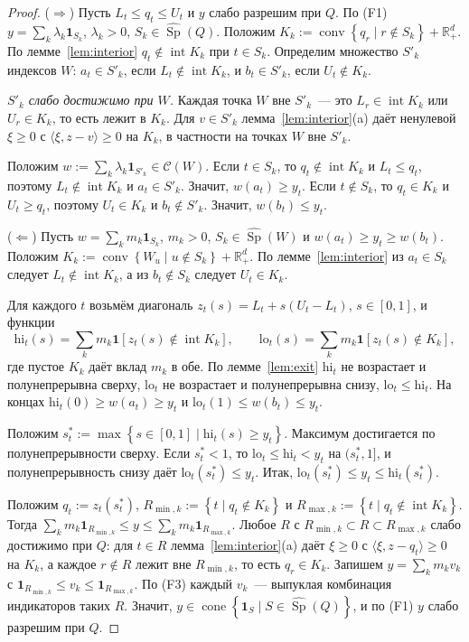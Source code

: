 \documentclass[a4paper,11pt]{article}
\theoremstyle{plain}
\theoremstyle{definition}
\theoremstyle{remark}
\newcommand{\R}{\mathbb{R}}
\newcommand{\set}[1]{\left\{ #1 \right\}}
\newcommand{\ip}[2]{\langle #1, #2\rangle}
\newcommand{\Rp}[1][2]{\R^{#1}_{+}}
\DeclareMathOperator{\conv}{conv}
\DeclareMathOperator{\cone}{cone}
\DeclareMathOperator{\Sp}{Sp}
\DeclareMathOperator{\interior}{int}
\newcommand{\Sw}{\widehat{\Sp}}
\newcommand{\Cw}{\mathcal C}
\begin{document}
\begin{proof}
    ($\Rightarrow$) Пусть $L_t\le q_t\le U_t$ и $y$ слабо разрешим при $Q$. По (F1) $y=\sum_k\lambda_k\mathbf 1_{S_k}$, $\lambda_k>0$, $S_k\in\Sw(Q)$. Положим $K_k:=\conv\set{q_r\mid r\notin S_k}+\Rp[d]$. По лемме~\ref{lem:interior} $q_t\notin\interior K_k$ при $t\in S_k$. Определим множество $S'_k$ индексов $W$: $a_t\in S'_k$, если $L_t\notin\interior K_k$, и $b_t\in S'_k$, если $U_t\notin K_k$.

    \emph{$S'_k$ слабо достижимо при $W$.} Каждая точка $W$ вне $S'_k$~--- это $L_r\in\interior K_k$ или $U_r\in K_k$, то есть лежит в $K_k$. Для $v\in S'_k$ лемма~\ref{lem:interior}(a) даёт ненулевой $\xi\ge0$ с $\ip{\xi}{z-v}\ge0$ на $K_k$, в частности на точках $W$ вне $S'_k$.

    Положим $w:=\sum_k\lambda_k\mathbf 1_{S'_k}\in\Cw(W)$. Если $t\in S_k$, то $q_t\notin\interior K_k$ и $L_t\le q_t$, поэтому $L_t\notin\interior K_k$ и $a_t\in S'_k$. Значит, $w(a_t)\ge y_t$. Если $t\notin S_k$, то $q_t\in K_k$ и $U_t\ge q_t$, поэтому $U_t\in K_k$ и $b_t\notin S'_k$. Значит, $w(b_t)\le y_t$.

    ($\Leftarrow$) Пусть $w=\sum_km_k\mathbf 1_{S_k}$, $m_k>0$, $S_k\in\Sw(W)$ и $w(a_t)\ge y_t\ge w(b_t)$. Положим $K_k:=\conv\set{W_u\mid u\notin S_k}+\Rp[d]$. По лемме~\ref{lem:interior} из $a_t\in S_k$ следует $L_t\notin\interior K_k$, а из $b_t\notin S_k$ следует $U_t\in K_k$.

    Для каждого $t$ возьмём диагональ $z_t(s)=L_t+s(U_t-L_t)$, $s\in[0,1]$, и функции
    \[
        \mathrm{hi}_t(s)=\sum_km_k\mathbf 1[z_t(s)\notin\interior K_k],\qquad
        \mathrm{lo}_t(s)=\sum_km_k\mathbf 1[z_t(s)\notin K_k],
    \]
    где пустое $K_k$ даёт вклад $m_k$ в обе. По лемме~\ref{lem:exit} $\mathrm{hi}_t$ не возрастает и полунепрерывна сверху, $\mathrm{lo}_t$ не возрастает и полунепрерывна снизу, $\mathrm{lo}_t\le\mathrm{hi}_t$. На концах $\mathrm{hi}_t(0)\ge w(a_t)\ge y_t$ и $\mathrm{lo}_t(1)\le w(b_t)\le y_t$.

    Положим $s^*_t:=\max\set{s\in[0,1]\mid\mathrm{hi}_t(s)\ge y_t}$. Максимум достигается по полунепрерывности сверху. Если $s^*_t<1$, то $\mathrm{lo}_t\le\mathrm{hi}_t<y_t$ на $(s^*_t,1]$, и полунепрерывность снизу даёт $\mathrm{lo}_t(s^*_t)\le y_t$. Итак, $\mathrm{lo}_t(s^*_t)\le y_t\le\mathrm{hi}_t(s^*_t)$.

    Положим $q_t:=z_t(s^*_t)$, $R_{\min,k}:=\set{t\mid q_t\notin K_k}$ и $R_{\max,k}:=\set{t\mid q_t\notin\interior K_k}$. Тогда $\sum_km_k\mathbf 1_{R_{\min,k}}\le y\le\sum_km_k\mathbf 1_{R_{\max,k}}$. Любое $R$ с $R_{\min,k}\subset R\subset R_{\max,k}$ слабо достижимо при $Q$: для $t\in R$ лемма~\ref{lem:interior}(a) даёт $\xi\ge0$ с $\ip{\xi}{z-q_t}\ge0$ на $K_k$, а каждое $r\notin R$ лежит вне $R_{\min,k}$, то есть $q_r\in K_k$. Запишем $y=\sum_km_kv_k$ с $\mathbf 1_{R_{\min,k}}\le v_k\le\mathbf 1_{R_{\max,k}}$. По (F3) каждый $v_k$~--- выпуклая комбинация индикаторов таких $R$. Значит, $y\in\cone\set{\mathbf 1_S\mid S\in\Sw(Q)}$, и по (F1) $y$ слабо разрешим при $Q$.
\end{proof}
\end{document}
